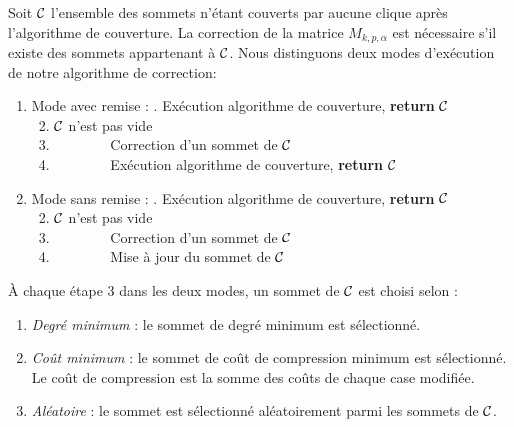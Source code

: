 Soit ${\cal C}$ l'ensemble des sommets n'\'etant couverts par aucune clique apr\`es l'algorithme de couverture.
La correction de la matrice $M_{k,p,\alpha}$ est n\'ecessaire s'il existe des sommets appartenant \`a ${\cal C}$. 
\newline
Nous distinguons deux modes d'ex\'ecution de notre algorithme de correction:
\begin{enumerate}
	\item Mode avec remise :
				\newline
				. Ex\'ecution algorithme de couverture, {\bf return} ${\cal C}$ \\
				~2.  ${\cal C}$ n'est pas vide\\ 
				~3.	       	\indent~~~~~~~~Correction d'un sommet de ${\cal C}$  \\
				~4.	       	\indent~~~~~~~~Ex\'ecution algorithme de couverture, {\bf return} ${\cal C}$ \\
	\item Mode sans remise :
				\newline
				. Ex\'ecution algorithme de couverture, {\bf return} ${\cal C}$ \\
				~2.  ${\cal C}$ n'est pas vide\\ 
				~3.	       	\indent~~~~~~~~Correction d'un sommet de ${\cal C}$  \\
				~4.	       	\indent~~~~~~~~Mise \`a jour du sommet  de ${\cal C}$  \\
\end{enumerate}
\`A chaque \'etape $3$ dans les deux modes, un sommet de $\cal C$ est choisi selon :
\begin{enumerate} [label = (\alph*)]
\item {\em Degr\'e minimum} : le sommet de degr\'e minimum est s\'electionn\'e. 
\item {\em Co\^ut minimum} : le sommet de  co\^ut de compression minimum est s\'electionn\'e. Le co\^ut de compression est la somme des co\^uts de chaque case modifi\'ee. 
\item {\em Al\'eatoire} : le sommet est s\'electionn\'e al\'eatoirement parmi les sommets de $\cal C$.
\end{enumerate}

